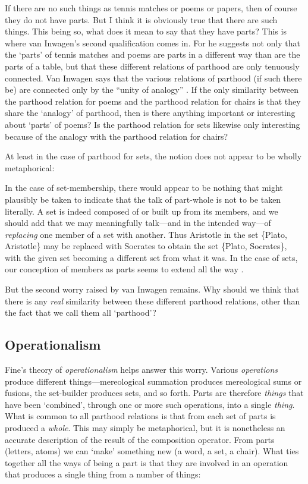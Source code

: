 \documentclass[11pt]{article}
\newenvironment{squote}{%
\begin{spacing}{1}
       	\begin{list}{}{%
\setlength{\labelwidth}{0pt}%
\rightmargin\leftmargin%
}
\item\relax
}{%
\end{list}%
\end{spacing}
}
\begin{document}
\begin{spacing}{1.25}
If there are no such things as tennis matches or poems or papers, then
of course they do not have parts.  But I think it is obviously true
that there are such things.  This being so, what does it mean to say
that they have parts?  This is where van Inwagen's second
qualification comes in.  For he suggests not only that the `parts' of
tennis matches and poems are parts in a different way than are the
parts of a table, but that these different relations of parthood are
only tenuously connected.  Van Inwagen says that the various relations
of parthood (if such there be) are connected only by the ``unity of
analogy'' \citeyearpar[19]{inwagen1995}.  If the only similarity
between the parthood relation for poems and the parthood relation for
chairs is that they share the `analogy' of parthood, then is there
anything important or interesting about `parts' of poems?  Is the
parthood relation for sets likewise only interesting because of the
analogy with the parthood relation for chairs?

At least in the case of parthood for sets, the notion does not appear
to be wholly metaphorical:

\begin{squote}
In the case of set-membership, there would appear to be nothing that
might plausibly be taken to indicate that the talk of part-whole is
not to be taken literally. A set is indeed composed of or built up
from its members, and we should add that we may meaningfully
talk---and in the intended way---of \emph{replacing} one member of a
set with another.  Thus Aristotle in the set \{Plato, Aristotle\} may
be replaced with Socrates to obtain the set \{Plato, Socrates\}, with
the given set becoming a different set from what it was. In the case
of sets, our conception of members as parts seems to extend all the
way \citep[564]{fine2010}.
\end{squote}

But the second worry raised by van Inwagen remains.  Why should we
think that there is any {\em real} similarity between these different
parthood relations, other than the fact that we call them all
`parthood'?

\subsection{Operationalism}
\label{operation}
Fine's theory of {\em operationalism} helps answer this worry.
Various {\em operations} produce different things---mereological
summation produces mereological sums or fusions, the set-builder
produces sets, and so forth.  Parts are therefore {\em things} that
have been `combined', through one or more such operations, into a
single {\em thing}.  What is common to all parthood relations is that
from each set of parts is produced a {\em whole}.  This may simply be
metaphorical, but it is nonetheless an accurate description of the
result of the composition operator.  From parts (letters, atoms) we
can `make' something new (a word, a set, a chair).  What ties together
all the ways of being a part is that they are involved in an operation
that produces a single thing from a number of things:


\end{spacing}
\end{document}
